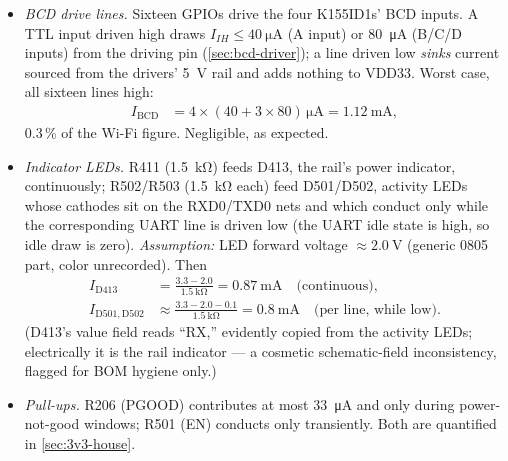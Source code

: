 \begin{itemize}
\item \emph{BCD drive lines.} Sixteen GPIOs drive the four K155ID1s' BCD inputs. A TTL
input driven high draws $I_{IH} \leq \SI{40}{\micro\ampere}$ (A input) or
\SI{80}{\micro\ampere} (B/C/D inputs) from the driving pin (\cref{sec:bcd-driver}); a
line driven low \emph{sinks} current sourced from the drivers' 5~V rail and adds nothing
to VDD33. Worst case, all sixteen lines high:
\begin{align*}
  I_{\mathrm{BCD}} &= 4 \times (40 + 3\times80)\,\si{\micro\ampere}
    = \SI{1.12}{\milli\ampere},
\end{align*}
0.3\,\% of the Wi-Fi figure. Negligible, as expected.
\item \emph{Indicator LEDs.} R411 (\SI{1.5}{\kilo\ohm}) feeds D413, the rail's power
indicator, continuously; R502/R503 (\SI{1.5}{\kilo\ohm} each) feed D501/D502, activity
LEDs whose cathodes sit on the RXD0/TXD0 nets and which conduct only while the
corresponding UART line is driven low (the UART idle state is high, so idle draw is
zero). \emph{Assumption:} LED forward voltage $\approx\SI{2.0}{\volt}$ (generic 0805
part, color unrecorded). Then
\begin{align*}
  I_{\mathrm{D413}} &= \frac{3.3-2.0}{\SI{1.5}{\kilo\ohm}} = \SI{0.87}{\milli\ampere}
    \quad\text{(continuous)}, \\
  I_{\mathrm{D501,D502}} &\approx \frac{3.3-2.0-0.1}{\SI{1.5}{\kilo\ohm}}
    = \SI{0.8}{\milli\ampere} \quad\text{(per line, while low).}
\end{align*}
(D413's value field reads ``RX,'' evidently copied from the activity LEDs; electrically
it is the rail indicator --- a cosmetic schematic-field inconsistency, flagged for BOM
hygiene only.)
\item \emph{Pull-ups.} R206 (PGOOD) contributes at most \SI{33}{\micro\ampere} and only
during power-not-good windows; R501 (EN) conducts only transiently. Both are quantified
in \cref{sec:3v3-house}.
\end{itemize}

